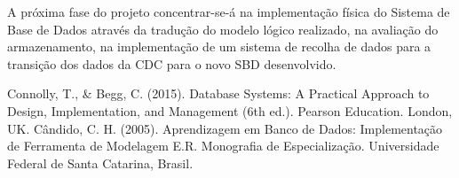 \documentclass[a4paper,12pt]{scrreprt}
\begin{document}
    A próxima fase do projeto concentrar-se-á na implementação física do Sistema de Base de Dados através da tradução do modelo lógico realizado, na avaliação do armazenamento, na implementação de um sistema de recolha de dados para a transição dos dados da CDC para o novo SBD desenvolvido.





\begin{thebibliography}{9}
Connolly, T., \& Begg, C. (2015). Database Systems: A Practical Approach to Design, Implementation, and Management (6th ed.). Pearson Education. London, UK.
Cândido, C. H. (2005). Aprendizagem em Banco de Dados: Implementação de Ferramenta de Modelagem E.R. Monografia de Especialização. Universidade Federal de Santa Catarina, Brasil.
\end{thebibliography}




\renewcommand{\nomname}{Lista de Siglas e Acrónimos}

\end{document}
